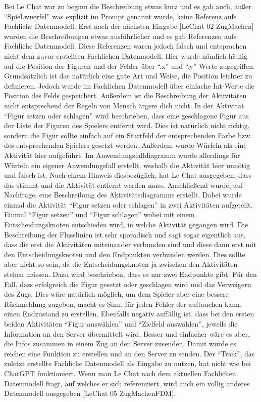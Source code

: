 Bei Le Chat war zu beginn die Beschreibung etwas kurz und es gab auch, außer ``Spiel.wuerfel'' was explizit im Prompt genannt wurde, keine Referenz aufs Fachliche Datenmodell.
Erst nach der nächsten Eingabe [LeChat 02 ZugMachen] wurden die Beschreibungen etwas ausführlicher und es gab Referenzen aufs Fachliche Datenmodell. Diese Referenzen waren 
jedoch falsch und entsprachen nicht dem zuvor erstellten Fachlichen Datenmodell. Hier wurde nämlich häufig auf die Position der Figuren und der Felder über ``.x'' und ``.y''
Werte zugegriffen. Grundsätzlich ist das natürlich eine gute Art und Weise, die Position leichter zu definieren. Jedoch wurde im Fachlichen Datenmodell über einfache Int-Werte
die Position des Felds gespeichert. Außerdem ist die Beschreibung der Aktivitäten nicht entsprechend der Regeln von Mensch ärgere dich nicht. In der 
Aktivität ``Figur setzen oder schlagen'' wird 
beschrieben, dass eine geschlagene Figur aus der Liste der Figuren des Spielers entfernt wird. Dies ist natürlich nicht richtig, sondern die Figur sollte einfach auf ein Startfeld 
der entsprechenden Farbe bzw. des entsprechenden Spielers gesetzt werden. Außerdem wurde Würfeln als eine Aktivität hier aufgeführt. Im Anwendungsfalldiagramm wurde allerdings
für Würfeln ein eigener Anwendungsfall erstellt, weshalb die Aktivität hier unnötig und falsch ist. Nach einem Hinweis diesbezüglich, hat Le Chat ausgegeben, dass das stimmt und
die Aktivität entfernt werden muss. Anschließend wurde, auf Nachfrage, eine Beschreibung des Aktivitätsdiagramms erstellt. Dabei wurde einmal die Aktivität ``Figur setzen oder 
schlagen'' in zwei Aktivitäten aufgeteilt. Einmal ``Figur setzen'' und ``Figur schlagen'' wobei mit einem Entscheidungsknoten entschieden wird, in welche Aktivität gegangen wird.
Die Beschreibung der Flusslinien ist sehr sporadisch und sagt sogar eigentlich aus, dass die erst die Aktivitäten miteinander verbunden sind und diese dann erst mit den 
Entscheidungsknoten und den Endpunkten verbunden werden. Dies sollte aber nicht so sein, da die Entscheidungsknoten ja zwischen den Aktivitäten stehen müssen. Dazu wird beschrieben, 
dass es nur zwei Endpunkte gibt. Für den Fall, dass erfolgreich die Figur gesetzt oder geschlagen wird und das Verweigern des Zugs.
Dies wäre natürlich möglich, um dem Spieler aber eine bessere Rückmeldung zugeben, macht es Sinn, für jeden Fehler der 
auftauchen kann, einen Endzustand zu erstellen. Ebenfalls negativ auffällig ist, dass bei den ersten
beiden Aktivitäten ``Figur auswählen'' und ``Zielfeld auswählen'', jeweils die Information an den Server übermittelt wird. Besser und einfacher wäre es aber, die Infos zusammen in einem
Zug an den Server zusenden. Damit würde es reichen eine Funktion zu erstellen und an den Server zu senden. Der ``Trick'', das zuletzt erstellte Fachliche Datenmodell als Eingabe 
zu nutzen, hat nicht wie bei ChatGPT funktioniert. Wenn man Le Chat nach dem aktuellen Fachlichen Datenmodell fragt, auf welches er sich referenziert, wird auch ein völlig anderes
Datenmodell ausgegeben [LeChat 05 ZugMachenFDM].\\

